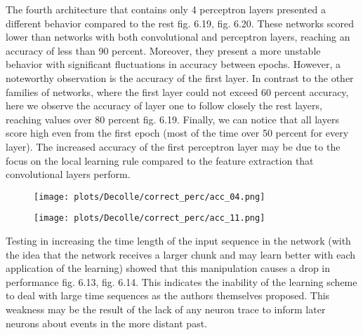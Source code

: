\documentclass[12pt]{report}
\begin{document}
The fourth architecture that contains only 4 perceptron layers presented a different behavior compared to the rest fig. 6.19, fig. 6.20. These networks scored lower than networks with both convolutional and perceptron layers, reaching an accuracy of less than 90 percent. Moreover, they present a more unstable behavior with significant fluctuations in accuracy between epochs. However, a noteworthy observation is the accuracy of the first layer. In contrast to the other families of networks, where the first layer could not exceed 60 percent accuracy, here we observe the accuracy of layer one to follow closely the rest layers, reaching values over 80 percent fig. 6.19. Finally, we can notice that all layers score high even from the first epoch (most of the time over 50 percent for every layer). The increased accuracy of the first perceptron layer may be due to the focus on the local learning rule compared to the feature extraction that convolutional layers perform.

\begin{figure}
\centering
\begin{minipage}{.4\textwidth}
  \centering
  \texttt{[image: plots/Decolle/correct\_perc/acc\_04.png]}
  \label{fig:test1}
\end{minipage}
\begin{minipage}{.4\textwidth}
  \centering
  \texttt{[image: plots/Decolle/correct\_perc/acc\_11.png]}
  \label{fig:test2}
\end{minipage}
\end{figure}

Testing in increasing the time length of the input sequence in the network (with the idea that the network receives a larger chunk and may learn better with each application of the learning) showed that this manipulation causes a drop in performance fig. 6.13, fig. 6.14. This indicates the inability of the learning scheme to deal with large time sequences as the authors themselves proposed. This weakness may be the result of the lack of any neuron trace to inform later neurons about events in the more distant past.
\end{document}
